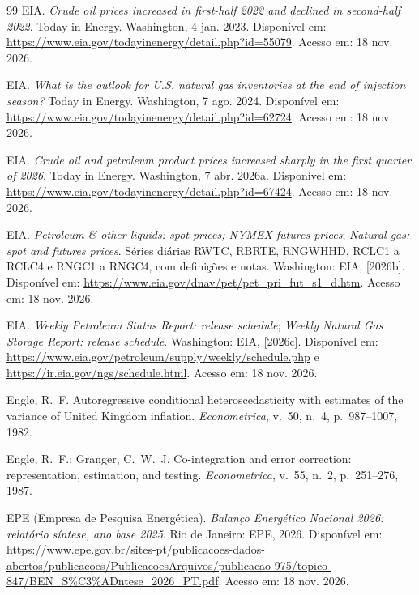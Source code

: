 \begin{thebibliography}{99}
EIA. \emph{Crude oil prices increased in first-half 2022 and declined in second-half 2022}. Today in Energy. Washington, 4 jan. 2023. Disponível em: \url{https://www.eia.gov/todayinenergy/detail.php?id=55079}. Acesso em: 18 nov. 2026.

EIA. \emph{What is the outlook for U.S. natural gas inventories at the end of injection season?} Today in Energy. Washington, 7 ago. 2024. Disponível em: \url{https://www.eia.gov/todayinenergy/detail.php?id=62724}. Acesso em: 18 nov. 2026.

EIA. \emph{Crude oil and petroleum product prices increased sharply in the first quarter of 2026}. Today in Energy. Washington, 7 abr. 2026a. Disponível em: \url{https://www.eia.gov/todayinenergy/detail.php?id=67424}. Acesso em: 18 nov. 2026.

EIA. \emph{Petroleum \& other liquids: spot prices; NYMEX futures prices}; \emph{Natural gas: spot and futures prices}. Séries diárias RWTC, RBRTE, RNGWHHD, RCLC1 a RCLC4 e RNGC1 a RNGC4, com definições e notas. Washington: EIA, [2026b]. Disponível em: \url{https://www.eia.gov/dnav/pet/pet_pri_fut_s1_d.htm}. Acesso em: 18 nov. 2026.

EIA. \emph{Weekly Petroleum Status Report: release schedule}; \emph{Weekly Natural Gas Storage Report: release schedule}. Washington: EIA, [2026c]. Disponível em: \url{https://www.eia.gov/petroleum/supply/weekly/schedule.php} e \url{https://ir.eia.gov/ngs/schedule.html}. Acesso em: 18 nov. 2026.

Engle, R.~F. Autoregressive conditional heteroscedasticity with estimates of the variance of United Kingdom inflation. \emph{Econometrica}, v.~50, n.~4, p.~987--1007, 1982.

Engle, R.~F.; Granger, C.~W.~J. Co-integration and error correction: representation, estimation, and testing. \emph{Econometrica}, v.~55, n.~2, p.~251--276, 1987.

EPE (Empresa de Pesquisa Energética). \emph{Balanço Energético Nacional 2026: relatório síntese, ano base 2025}. Rio de Janeiro: EPE, 2026. Disponível em: \url{https://www.epe.gov.br/sites-pt/publicacoes-dados-abertos/publicacoes/PublicacoesArquivos/publicacao-975/topico-847/BEN_S\%C3\%ADntese_2026_PT.pdf}. Acesso em: 18 nov. 2026.


\end{thebibliography}

